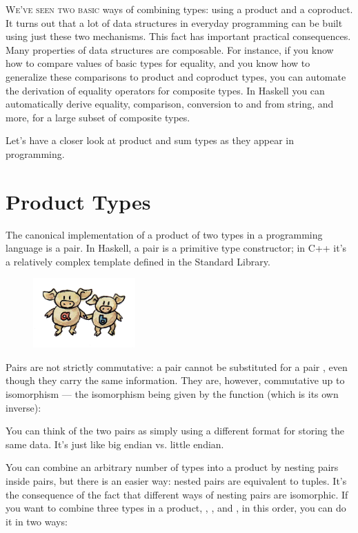 
\lettrine[lhang=0.17]{W}{e've seen two basic} ways of combining types: using a product and a
coproduct. It turns out that a lot of data structures in everyday
programming can be built using just these two mechanisms. This fact has
important practical consequences. Many properties of data structures are
composable. For instance, if you know how to compare values of basic
types for equality, and you know how to generalize these comparisons to
product and coproduct types, you can automate the derivation of equality
operators for composite types. In Haskell you can automatically derive
equality, comparison, conversion to and from string, and more, for a
large subset of composite types.

Let's have a closer look at product and sum types as they appear in
programming.

\section{Product Types}

The canonical implementation of a product of two types in a programming
language is a pair. In Haskell, a pair is a primitive type constructor;
in C++ it's a relatively complex template defined in the Standard
Library.

\begin{figure}[H]
\centering
\includegraphics[width=0.35\textwidth]{images/pair.jpg}
\end{figure}

\noindent
Pairs are not strictly commutative: a pair  cannot
be substituted for a pair , even though they carry
the same information. They are, however, commutative up to isomorphism
--- the isomorphism being given by the  function (which is
its own inverse):

You can think of the two pairs as simply using a different format for
storing the same data. It's just like big endian vs. little endian.

You can combine an arbitrary number of types into a product by nesting
pairs inside pairs, but there is an easier way: nested pairs are
equivalent to tuples. It's the consequence of the fact that different
ways of nesting pairs are isomorphic. If you want to combine three types
in a product, , , and , in this order, you
can do it in two ways:

